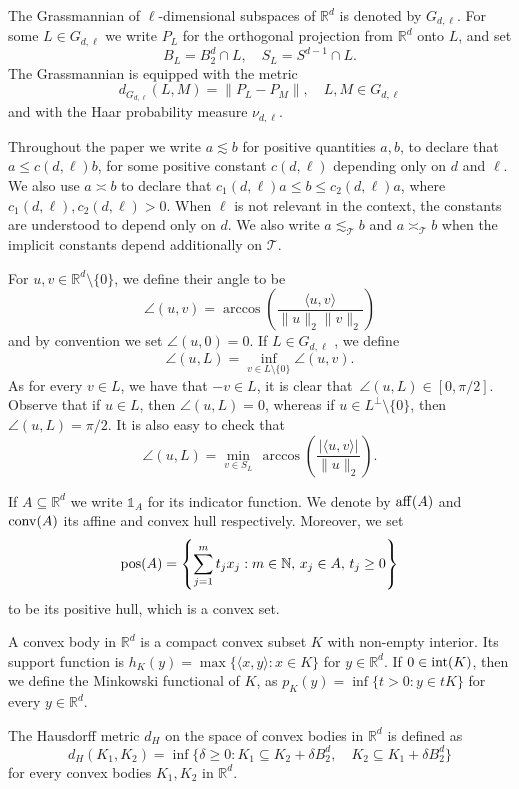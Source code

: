 \documentclass[10pt]{amsart}
\newcommand{\1}{\textbf{1}}
\newcommand{\conv}{{\rm conv}}
\newcommand{\pos}{{\rm pos}}
\numberwithin{equation}{section} %
\theoremstyle{remark}
\theoremstyle{definition}
\begin{document}
The Grassmannian of $\ell$-dimensional subspaces of $\mathbb{R}^d$ is denoted by $G_{d,\ell}$. For some $L \in G_{d,\ell}$ we write $P_L$ for the orthogonal projection from $\mathbb{R}^d$ onto $L$, and set \[B_L=B_2^d \cap L, \quad S_L=S^{d-1}\cap L. \] The Grassmannian is equipped with the metric \[d_{G_{d,\ell}}(L,M)=\|P_L-P_M\|, \quad L,M \in G_{d,\ell}\] and  with the Haar probability measure $\nu_{d,\ell}$. 

Throughout the paper we write $a \lesssim b$ for positive quantities $a,b$, to declare that $a \leq c(d,\ell) b$, for some positive constant $c(d,\ell)$ depending only on $d$ and $\ell$. We also use $a \asymp b$ to declare that $c_1(d,\ell)a \leq b \leq c_2(d,\ell)a$, where $c_1(d,\ell),c_2(d,\ell)>0$. When $\ell$ is not relevant in the context, the constants are understood to depend only on $d$. We also write $a \lesssim_{\mathcal{T}} b$ and $a \asymp_{\mathcal{T}} b$ when the implicit constants depend additionally on $\mathcal{T}$.

For $u,v \in \mathbb{R}^d \setminus \{0\}$, we define their angle to be \[\angle(u,v)=\arccos\left( \frac{\langle u,v \rangle}{\|u\|_2  \|v\|_2}\right)\] and by convention we set $\angle(u,0)=0$. If $L \in G_{d,\ell}$ , we define \[\angle(u, L)=\inf_{v \in L\setminus\{0\}} \angle(u,v).\] As for every $v \in L$, we have that $-v \in L$, it is clear  that $\, \angle(u,L) \in [0,\pi/2]$. Observe that if $u \in L$, then $\angle(u,L)=0$, whereas if $u \in L^\perp \setminus\{0\}$, then $\angle(u,L)=\pi/2$. It is also easy to check that \[\angle(u,L)=\min_{v \in S_L} \, \arccos \left( \frac{|\langle u,v \rangle|}{\|u\|_2} \right).\]

If $A \subseteq \mathbb{R}^d$ we write $\mathds{1}_A$ for its indicator function. We denote by ${\rm aff}(A)$ and $\conv(A)$  its affine and convex hull respectively. Moreover, we set \[\pos(A)=\left\{\sum_{j=1}^{m}t_jx_j: m \in \mathbb{N}, \, x_j \in A, \, t_j \geq 0 \right\}\] to be its positive hull, which is a convex set.

A convex body in $\mathbb{R}^d$ is a compact convex subset $K$ with non-empty interior. Its support function is $h_K(y)=\max \{\langle x,y\rangle: x \in K\}$ for $y \in \mathbb{R}^d$. If $0 \in {\rm int} (K)$, then we define the Minkowski functional of $K$, as $p_K(y)=\inf \{ t>0: y \in tK\}$ for every $y \in \mathbb{R}^d$.

The Hausdorff metric $d_H$ on the space of convex bodies in $\mathbb{R}^d$ is defined as \[d_H(K_1,K_2) =\inf\{\delta \geq 0: K_1 \subseteq K_2+\delta B_2^d, \quad K_2 \subseteq K_1+\delta B_2^d\}\] for every convex bodies $K_1,K_2$ in $\mathbb{R}^d$.
\end{document}
